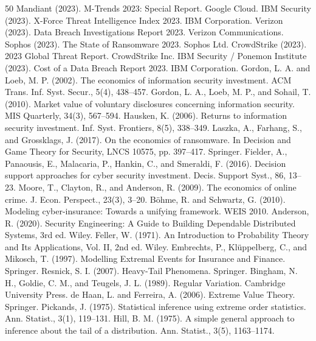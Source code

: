 \begin{thebibliography}{50}
 Mandiant (2023). M-Trends 2023: Special Report. Google Cloud.
 IBM Security (2023). X-Force Threat Intelligence Index 2023. IBM Corporation.
 Verizon (2023). Data Breach Investigations Report 2023. Verizon Communications.
 Sophos (2023). The State of Ransomware 2023. Sophos Ltd.
 CrowdStrike (2023). 2023 Global Threat Report. CrowdStrike Inc.
 IBM Security / Ponemon Institute (2023). Cost of a Data Breach Report 2023. IBM Corporation.
 Gordon, L. A. and Loeb, M. P. (2002). The economics of information security investment. ACM Trans. Inf. Syst. Secur., 5(4), 438--457.
 Gordon, L. A., Loeb, M. P., and Sohail, T. (2010). Market value of voluntary disclosures concerning information security. MIS Quarterly, 34(3), 567--594.
 Hausken, K. (2006). Returns to information security investment. Inf. Syst. Frontiers, 8(5), 338--349.
 Laszka, A., Farhang, S., and Grossklags, J. (2017). On the economics of ransomware. In Decision and Game Theory for Security, LNCS 10575, pp. 397--417. Springer.
 Fielder, A., Panaousis, E., Malacaria, P., Hankin, C., and Smeraldi, F. (2016). Decision support approaches for cyber security investment. Decis. Support Syst., 86, 13--23.
 Moore, T., Clayton, R., and Anderson, R. (2009). The economics of online crime. J. Econ. Perspect., 23(3), 3--20.
 Böhme, R. and Schwartz, G. (2010). Modeling cyber-insurance: Towards a unifying framework. WEIS 2010.
 Anderson, R. (2020). Security Engineering: A Guide to Building Dependable Distributed Systems, 3rd ed. Wiley.
 Feller, W. (1971). An Introduction to Probability Theory and Its Applications, Vol. II, 2nd ed. Wiley.
 Embrechts, P., Klüppelberg, C., and Mikosch, T. (1997). Modelling Extremal Events for Insurance and Finance. Springer.
 Resnick, S. I. (2007). Heavy-Tail Phenomena. Springer.
 Bingham, N. H., Goldie, C. M., and Teugels, J. L. (1989). Regular Variation. Cambridge University Press.
 de Haan, L. and Ferreira, A. (2006). Extreme Value Theory. Springer.
 Pickands, J. (1975). Statistical inference using extreme order statistics. Ann. Statist., 3(1), 119--131.
 Hill, B. M. (1975). A simple general approach to inference about the tail of a distribution. Ann. Statist., 3(5), 1163--1174.

\end{thebibliography}
